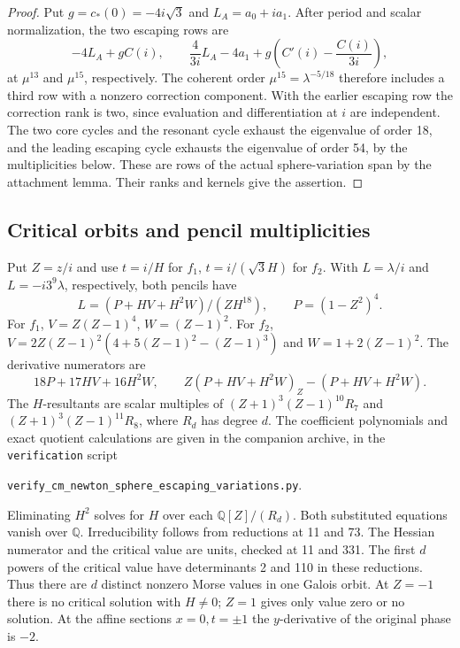 \documentclass[11pt]{article}
\begin{document}
\begin{proof}
Put \(g=c_*(0)=-4i\sqrt3\) and
\(L_A=a_0+i a_1\). After period and scalar normalization,
the two escaping rows are
\[
  -4L_A+g C(i), \qquad
  \frac{4}{3i}L_A-4a_1+g\left(C'(i)-\frac{C(i)}{3i}\right),
\]
at \(\mu^{13}\) and \(\mu^{15}\), respectively.
The coherent order \(\mu^{15}=\lambda^{-5/18}\) therefore
includes a third row with a nonzero correction component.
With the earlier escaping row the correction rank is
two, since evaluation and differentiation at \(i\) are
independent. The two core cycles and the resonant cycle
exhaust the eigenvalue of order 18, and the leading
escaping cycle exhausts the eigenvalue of order 54, by
the multiplicities below. These are rows of the actual
sphere-variation span by the attachment lemma. Their
ranks and kernels give the assertion.
\end{proof}

\subsection{Critical orbits and pencil multiplicities}
\label{sec:pencil-checks}

Put \(Z=z/i\) and use \(t=i/H\) for \(f_1\), \(t=i/(\sqrt3 H)\)
for \(f_2\). With \(L=\lambda/i\) and \(L=-i3^9\lambda\),
respectively, both pencils have
\[
 L=(P+HV+H^2W)/(ZH^{18}),\qquad P=(1-Z^2)^4 .
\]
For \(f_1\), \(V=Z(Z-1)^4\), \(W=(Z-1)^2\).
For \(f_2\), \(V=2Z(Z-1)^2(4+5(Z-1)^2-(Z-1)^3)\)
and \(W=1+2(Z-1)^2\). The derivative numerators are
\[
 18P+17HV+16H^2W,\qquad Z(P+HV+H^2W)_Z-(P+HV+H^2W).
\]
The \(H\)-resultants are scalar multiples of
\((Z+1)^3(Z-1)^{10}R_7\) and \((Z+1)^3(Z-1)^{11}R_8\),
where \(R_d\) has degree \(d\). The coefficient polynomials
and exact quotient calculations are given in the companion archive,
in the \texttt{verification} script
\begin{center}
\small\texttt{verify\_cm\_newton\_sphere\_escaping\_variations.py}.
\end{center}
\noindent Eliminating \(H^2\) solves for \(H\) over each
\(\mathbb Q[Z]/(R_d)\). Both substituted equations vanish
over \(\mathbb Q\). Irreducibility follows from reductions
at 11 and 73. The Hessian numerator and the critical
value are units, checked at 11 and 331. The first \(d\)
powers of the critical value have determinants 2 and
110 in these reductions. Thus there are \(d\) distinct
nonzero Morse values in one Galois orbit. At \(Z=-1\)
there is no critical solution with \(H\ne0\); \(Z=1\)
gives only value zero or no solution. At the affine
sections \(x=0,t=\pm1\) the \(y\)-derivative of the
original phase is \(-2\).
\end{document}
